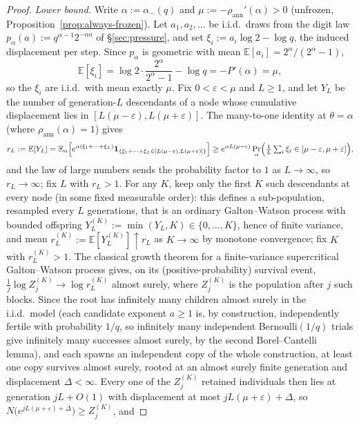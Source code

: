 \documentclass[11pt]{article}
\theoremstyle{remark}
\begin{document}
\begin{proof}
\emph{Lower bound.} Write $\alpha:=\alpha_-(q)$ and
$\mu:=-\rho_{\mathrm{ann}}'(\alpha)>0$ (unfrozen,
Proposition~\ref{prop:always-frozen}). Let $a_1,a_2,\ldots$ be i.i.d.\
draws from the digit law $p_\alpha(a):=q^{\alpha-1}2^{-\alpha a}$ of
\S\ref{sec:pressure}, and set $\xi_i:=a_i\log2-\log q$, the induced
displacement per step. Since $p_\alpha$ is geometric with mean
$\mathbb E[a_i]=2^\alpha/(2^\alpha-1)$,
\[
 \mathbb E[\xi_i]=\log2\cdot\frac{2^\alpha}{2^\alpha-1}-\log q
 =-P'(\alpha)=\mu,
\]
so the $\xi_i$ are i.i.d.\ with mean exactly $\mu$. Fix $0<\varepsilon<\mu$
and $L\ge1$, and let $Y_L$ be the
number of generation-$L$ descendants of a node whose cumulative
displacement lies in $[L(\mu-\varepsilon),L(\mu+\varepsilon)]$. The
many-to-one identity at $\theta=\alpha$ (where $\rho_{\mathrm{ann}}(\alpha)=1$)
gives
\[
 r_L:=\mathbb E[Y_L]
 =\mathbb E_\alpha\Bigl[e^{\alpha(\xi_1+\cdots+\xi_L)}
   \mathbf 1_{\{\xi_1+\cdots+\xi_L\in[L(\mu-\varepsilon),L(\mu+\varepsilon)]\}}\Bigr]
 \ge e^{\alpha L(\mu-\varepsilon)}
   \Pr_\alpha\Bigl(\tfrac1L\textstyle\sum_i\xi_i\in[\mu-\varepsilon,\mu+\varepsilon]\Bigr),
\]
and the law of large numbers sends the probability factor to $1$ as
$L\to\infty$, so $r_L\to\infty$; fix $L$ with $r_L>1$. For any $K$,
keep only the first $K$ such descendants at every node (in some fixed
measurable order): this defines a sub-population, resampled
every $L$ generations, that is an ordinary Galton--Watson process with
bounded offspring $Y_L^{(K)}:=\min(Y_L,K)\in\{0,\ldots,K\}$, hence of
finite variance, and mean $r_L^{(K)}:=\mathbb E[Y_L^{(K)}]\uparrow r_L$
as $K\to\infty$ by monotone convergence; fix $K$ with $r_L^{(K)}>1$.
The classical growth theorem for a finite-variance supercritical
Galton--Watson process gives, on its (positive-probability) survival
event, $\frac1j\log Z_j^{(K)}\to\log r_L^{(K)}$ almost surely, where
$Z_j^{(K)}$ is the population after $j$ such blocks. Since the root has
infinitely many children almost surely in the i.i.d.\ model (each
candidate exponent $a\ge1$ is, by construction, independently fertile
with probability $1/q$, so infinitely many independent Bernoulli$(1/q)$
trials give infinitely many successes almost surely, by the second
Borel--Cantelli lemma), and each spawns an independent copy of the whole
construction, at least one copy survives almost surely, rooted at an
almost surely finite generation and displacement
$\Delta<\infty$. Every one of the $Z_j^{(K)}$ retained individuals then
lies at generation $jL+O(1)$ with displacement at most
$jL(\mu+\varepsilon)+\Delta$, so
$N\bigl(e^{jL(\mu+\varepsilon)+\Delta}\bigr)\ge Z_j^{(K)}$, and

\end{proof}
\end{document}
